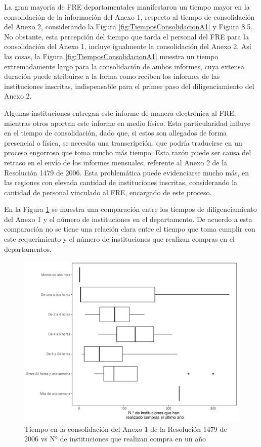 \documentclass[
]{book}
\begin{document}
La gran mayoría de FRE departamentales manifestaron un tiempo mayor en la consolidación de la información del Anexo 1, respecto al tiempo de consolidación del Anexo 2, considerando la Figura \ref{fig:TiemposConsolidacionA1} y Figura 8.5. No obstante, esta percepción del tiempo que tarda el personal del FRE para la consolidación del Anexo 1, incluye igualmente la consolidación del Anexo 2. Así las cosas, la Figura \ref{fig:TiemposConsolidacionA1} muestra un tiempo extremadamente largo para la consolidación de ambos informes, cuya extensa duración puede atribuirse a la forma como reciben los informes de las instituciones inscritas, indispensable para el primer paso del diligenciamiento del Anexo 2.

Algunas instituciones entregan este informe de manera electrónica al FRE, mientras otros aportan este informe en medio físico. Esta particularidad influye en el tiempo de consolidación, dado que, si estos son allegados de forma presencial o física, se necesita una transcripción, que podría traducirse en un proceso engorroso que toma mucho más tiempo. Esta razón puede ser causa del retraso en el envío de los informes mensuales, referente al Anexo 2 de la Resolución 1479 de 2006. Esta problemática puede evidenciarse mucho más, en las regiones con elevada cantidad de instituciones inscritas, considerando la cantidad de personal vinculado al FRE, encargado de este proceso.

En la Figura \ref{fig:TiemposConsolidacionA1-1} se muestra una comparación entre los tiempos de diligenciamiento del Anexo 1 y el número de instituciones en el departamento. De acuerdo a esta comparación no se tiene una relación clara entre el tiempo que toma cumplir con este requerimiento y el número de instituciones que realizan compras en el departamentos.

\begin{figure}

{\centering \includegraphics[width=0.85\linewidth]{InformeFinal_files/figure-latex/TiemposConsolidacionA1-1-1} 

}

\caption{Tiempo en la consolidación del Anexo 1 de la Resolución 1479 de 2006 vs N° de instituciones que realizan compra en un año}\label{fig:TiemposConsolidacionA1-1}
\end{figure}
\end{document}
